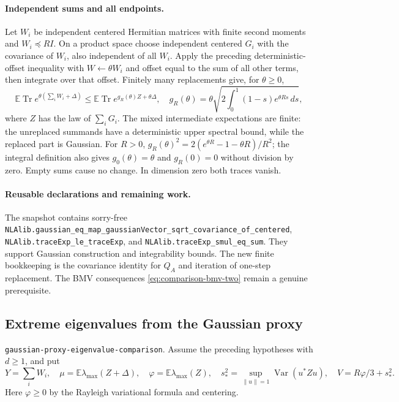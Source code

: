 \documentclass[11pt,a4paper]{article}
\newcommand{\norm}[1]{\left\lVert#1\right\rVert}
\DeclareRobustCommand{\code}[1]{{\footnotesize\urlstyle{tt}\nolinkurl{#1}}}
\begin{document}
\paragraph{Independent sums and all endpoints.}
Let $W_i$ be independent centered Hermitian matrices with finite second
moments and $W_i\preceq RI$.  On a product space choose independent
centered $G_i$ with the covariance of $W_i$, also independent of all $W_i$.
Apply the preceding deterministic-offset inequality with
$W\leftarrow\theta W_i$ and offset equal to the sum of all other terms,
then integrate over that offset.  Finitely many replacements give, for
$\theta\ge0$,
\begin{equation}\label{eq:comparison-trace-mgf}
 \mathbb E\operatorname{Tr}e^{\theta(\sum_iW_i+\Delta)}
 \le\mathbb E\operatorname{Tr}e^{g_R(\theta)Z+\theta\Delta},
 \quad
 g_R(\theta)=\theta\sqrt{2\int_0^1(1-s)e^{\theta Rs}\,ds},
\end{equation}
where $Z$ has the law of $\sum_iG_i$.  The mixed intermediate expectations
are finite: the unreplaced summands have a deterministic upper spectral
bound, while the replaced part is Gaussian.  For $R>0$,
$g_R(\theta)^2=2(e^{\theta R}-1-\theta R)/R^2$; the integral definition
also gives $g_0(\theta)=\theta$ and $g_R(0)=0$ without division by zero.
Empty sums cause no change.  In dimension zero both traces vanish.

\paragraph{Reusable declarations and remaining work.}
The snapshot contains sorry-free
\code{NLAlib.gaussian_eq_map_gaussianVector_sqrt_covariance_of_centered},
\code{NLAlib.traceExp_le_traceExp}, and
\code{NLAlib.traceExp_smul_eq_sum}.  They support Gaussian construction
and integrability bounds.  The new finite bookkeeping is the covariance
identity for $Q_A$ and iteration of one-step replacement.  The
BMV consequences \eqref{eq:comparison-bmv-two} remain a genuine prerequisite.

\subsection{Extreme eigenvalues from the Gaussian proxy}
\label{route:gaussian-proxy-eigenvalue-comparison}
\code{gaussian-proxy-eigenvalue-comparison}.
Assume the preceding hypotheses with $d\ge1$, and put
\[
 Y=\sum_iW_i,\quad
 \mu=\mathbb E\lambda_{\max}(Z+\Delta),\quad
 \varphi=\mathbb E\lambda_{\max}(Z),\quad
 s_*^2=\sup_{\norm{u}=1}\operatorname{Var}(u^*Zu),\quad
 V=R\varphi/3+s_*^2.
\]
Here $\varphi\ge0$ by the Rayleigh variational formula and centering.
\end{document}
